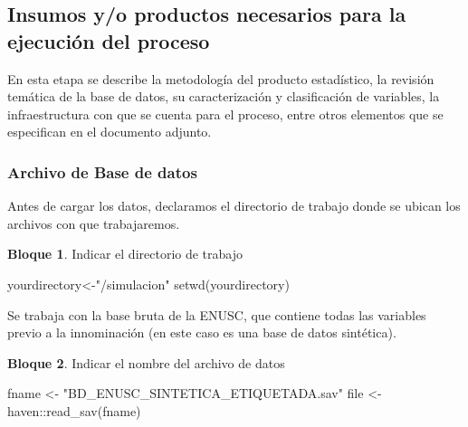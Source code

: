 \documentclass[
]{book}
\newenvironment{Shaded}{\begin{snugshade}}{\end{snugshade}}
\newcommand{\FunctionTok}[1]{\textcolor[rgb]{0.00,0.00,0.00}{#1}}
\newcommand{\NormalTok}[1]{#1}
\newcommand{\OtherTok}[1]{\textcolor[rgb]{0.56,0.35,0.01}{#1}}
\newcommand{\SpecialCharTok}[1]{\textcolor[rgb]{0.00,0.00,0.00}{#1}}
\newcommand{\StringTok}[1]{\textcolor[rgb]{0.31,0.60,0.02}{#1}}
\theoremstyle{definition}
\theoremstyle{definition}
\newtheorem{example}{Bloque}[chapter]
\theoremstyle{definition}
\theoremstyle{definition}
\theoremstyle{remark}
\begin{document}
\hypertarget{insumos-yo-productos-necesarios-para-la-ejecuciuxf3n-del-proceso}{%
\subsection{Insumos y/o productos necesarios para la ejecución del proceso}\label{insumos-yo-productos-necesarios-para-la-ejecuciuxf3n-del-proceso}}

En esta etapa se describe la metodología del producto estadístico, la revisión temática de la base de datos, su caracterización y clasificación de variables, la infraestructura con que se cuenta para el proceso, entre otros elementos que se especifican en el documento adjunto.

\hypertarget{archivo-de-base-de-datos}{%
\subsubsection{Archivo de Base de datos}\label{archivo-de-base-de-datos}}

Antes de cargar los datos, declaramos el directorio de trabajo donde se ubican los archivos con que trabajaremos.

\begin{example}
\protect\hypertarget{exm:bloque1nbm}{}\label{exm:bloque1nbm}Indicar el directorio de trabajo
\end{example}

\begin{Shaded}
\begin{Highlighting}[]
\NormalTok{yourdirectory}\OtherTok{\textless{}{-}}\StringTok{"/simulacion"} 
\FunctionTok{setwd}\NormalTok{(yourdirectory)}
\end{Highlighting}
\end{Shaded}

Se trabaja con la base bruta de la ENUSC, que contiene todas las variables previo a la innominación (en este caso es una base de datos sintética).

\begin{example}
\protect\hypertarget{exm:bloque2nbm}{}\label{exm:bloque2nbm}Indicar el nombre del archivo de datos
\end{example}

\begin{Shaded}
\begin{Highlighting}[]
\NormalTok{fname }\OtherTok{\textless{}{-}} \StringTok{"BD\_ENUSC\_SINTETICA\_ETIQUETADA.sav"}
\NormalTok{file }\OtherTok{\textless{}{-}}\NormalTok{ haven}\SpecialCharTok{::}\FunctionTok{read\_sav}\NormalTok{(fname)}
\end{Highlighting}
\end{Shaded}
\end{document}
